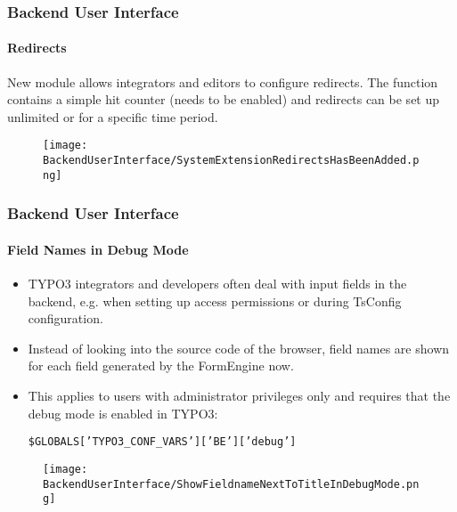 
\begin{frame}[fragile]
	\frametitle{Backend User Interface}
	\framesubtitle{Redirects}

	New module allows integrators and editors to configure redirects.
	The function contains a simple hit counter (needs to be enabled) and
	redirects can be set up unlimited or for a specific time period.

	\begin{figure}
		\texttt{[image: BackendUserInterface/SystemExtensionRedirectsHasBeenAdded.png]}
	\end{figure}

\end{frame}


\begin{frame}[fragile]
	\frametitle{Backend User Interface}
	\framesubtitle{Field Names in Debug Mode}

	\begin{itemize}

		\item TYPO3 integrators and developers often deal with input fields in the backend,
			e.g. when setting up access permissions or during TsConfig configuration.

		\item Instead of looking into the source code of the browser, field names are shown
			for each field generated by the FormEngine now.

		\item This applies to users with administrator privileges only and requires that
			the debug mode is enabled in TYPO3:

			\smaller
				\texttt{\$GLOBALS['TYPO3\_CONF\_VARS']['BE']['debug']}
			\normalsize

	\end{itemize}

	\begin{figure}
		\texttt{[image: BackendUserInterface/ShowFieldnameNextToTitleInDebugMode.png]}
	\end{figure}

\end{frame}

